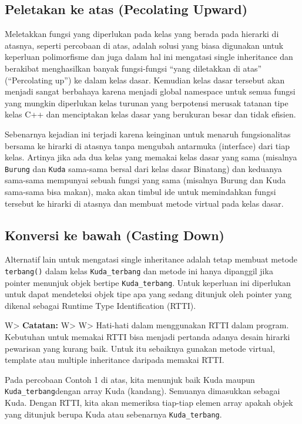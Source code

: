 \subsection{Peletakan ke atas (Pecolating
Upward)}\label{peletakan-ke-atas-pecolating-upward}

Meletakkan fungsi yang diperlukan pada kelas yang berada pada hierarki
di atasnya, seperti percobaan di atas, adalah solusi yang biasa
digunakan untuk keperluan polimorfisme dan juga dalam hal ini mengatasi
single inheritance dan berakibat menghasilkan banyak fungsi-fungsi
``yang diletakkan di atas'' (``Percolating up'') ke dalam kelas dasar.
Kemudian kelas dasar tersebut akan menjadi sangat berbahaya karena
menjadi global namespace untuk semua fungsi yang mungkin diperlukan
kelas turunan yang berpotensi merusak tatanan tipe kelas C++ dan
menciptakan kelas dasar yang berukuran besar dan tidak efisien.

Sebenarnya kejadian ini terjadi karena keinginan untuk menaruh
fungsionalitas bersama ke hirarki di atasnya tanpa mengubah antarmuka
(interface) dari tiap kelas. Artinya jika ada dua kelas yang memakai
kelas dasar yang sama (misalnya \texttt{Burung} dan \texttt{Kuda}
sama-sama bersal dari kelas dasar Binatang) dan keduanya sama-sama
mempunyai sebuah fungsi yang sama (misalnya Burung dan Kuda sama-sama
bisa makan), maka akan timbul ide untuk memindahkan fungsi tersebut ke
hirarki di atasnya dan membuat metode virtual pada kelas dasar.

\subsection{Konversi ke bawah (Casting
Down)}\label{konversi-ke-bawah-casting-down}

Alternatif lain untuk mengatasi single inheritance adalah tetap membuat
metode \texttt{terbang()} dalam kelas \texttt{Kuda\_terbang} dan metode
ini hanya dipanggil jika pointer menunjuk objek bertipe
\texttt{Kuda\_terbang}. Untuk keperluan ini diperlukan untuk dapat
mendeteksi objek tipe apa yang sedang ditunjuk oleh pointer yang dikenal
sebagai Runtime Type Identification (RTTI).

W\textgreater{} \textbf{Catatan:} W\textgreater{} W\textgreater{}
Hati-hati dalam menggunakan RTTI dalam program. Kebutuhan untuk memakai
RTTI bisa menjadi pertanda adanya desain hirarki pewarisan yang kurang
baik. Untuk itu sebaiknya gunakan metode virtual, template atau multiple
inheritance daripada memakai RTTI.

Pada percobaan Contoh 1 di atas, kita menunjuk baik Kuda maupun
\texttt{Kuda\_terbang}dengan array Kuda (kandang). Semuanya dimasukkan
sebagai Kuda. Dengan RTTI, kita akan memeriksa tiap-tiap elemen array
apakah objek yang ditunjuk berupa Kuda atau sebenarnya
\texttt{Kuda\_terbang}.

